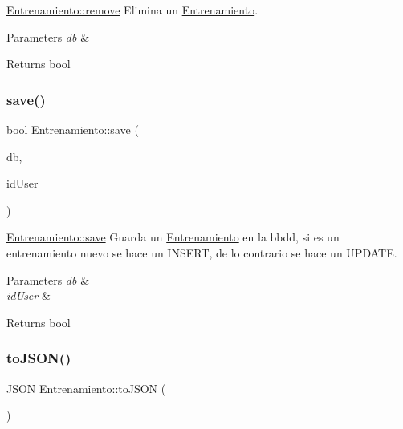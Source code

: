 \mbox{\hyperlink{classEntrenamiento_adedf18d9eef76aab0c4d6325de2ff175}{Entrenamiento\+::remove}} Elimina un \mbox{\hyperlink{classEntrenamiento}{Entrenamiento}}. 


\begin{DoxyParams}{Parameters}
{\em db} & \\
\hline
\end{DoxyParams}
\begin{DoxyReturn}{Returns}
bool 
\end{DoxyReturn}
\mbox{\label{classEntrenamiento_a4b97075e3cb6f52c3e1bf2117e276875}} 
\subsubsection{\texorpdfstring{save()}{save()}}
{\footnotesize\ttfamily bool Entrenamiento\+::save (\begin{DoxyParamCaption}\item[{Q\+Sql\+Database}]{db,  }\item[{int}]{id\+User }\end{DoxyParamCaption})}



\mbox{\hyperlink{classEntrenamiento_a4b97075e3cb6f52c3e1bf2117e276875}{Entrenamiento\+::save}} Guarda un \mbox{\hyperlink{classEntrenamiento}{Entrenamiento}} en la bbdd, si es un entrenamiento nuevo se hace un I\+N\+S\+E\+RT, de lo contrario se hace un U\+P\+D\+A\+TE. 


\begin{DoxyParams}{Parameters}
{\em db} & \\
\hline
{\em id\+User} & \\
\hline
\end{DoxyParams}
\begin{DoxyReturn}{Returns}
bool 
\end{DoxyReturn}
\mbox{\label{classEntrenamiento_a4a0e1dcb5ff226db68e8621a7102ee12}} 
\subsubsection{\texorpdfstring{to\+J\+S\+O\+N()}{toJSON()}}
{\footnotesize\ttfamily J\+S\+ON Entrenamiento\+::to\+J\+S\+ON (\begin{DoxyParamCaption}{ }\end{DoxyParamCaption})}



